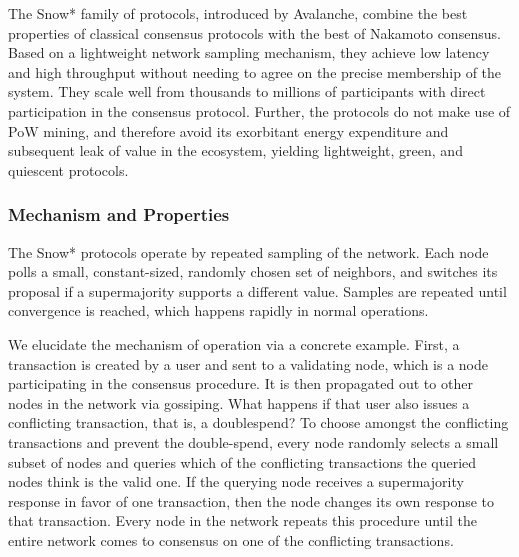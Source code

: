\documentclass[runningheads]{llncs}
\begin{document}
The Snow* family of protocols, introduced by Avalanche, combine the best properties of classical consensus protocols with the best of Nakamoto consensus. 
Based on a lightweight network sampling mechanism, they achieve low latency and high throughput without needing to agree on the precise membership of the system. 
They scale well from thousands to millions of participants with direct participation in the consensus protocol. 
Further, the protocols do not make use of PoW mining, and therefore avoid its exorbitant energy expenditure and subsequent leak of value in the ecosystem, yielding lightweight, green, and quiescent protocols. 

\subsubsection{Mechanism and Properties}
The Snow* protocols operate by repeated sampling of the network. 
Each node polls a small, constant-sized, randomly chosen set of neighbors, and switches its proposal if a supermajority supports a different value. 
Samples are repeated until convergence is reached, which happens rapidly in normal operations.

We elucidate the mechanism of operation via a concrete example. First, a transaction is created by a user and sent to a validating node, which is a node participating in the consensus procedure. It is then propagated out to other nodes in the network via gossiping. What happens if that user also issues a conflicting transaction, that is, a doublespend? To choose amongst the conflicting transactions and prevent the double-spend, every node randomly selects a small subset of nodes and queries which of the conflicting transactions the queried nodes think is the valid one. If the querying node receives a supermajority response in favor of one transaction, then the node changes its own response to that transaction. Every node in the network repeats this procedure until the entire network comes to consensus on one of the conflicting transactions. 
\end{document}
